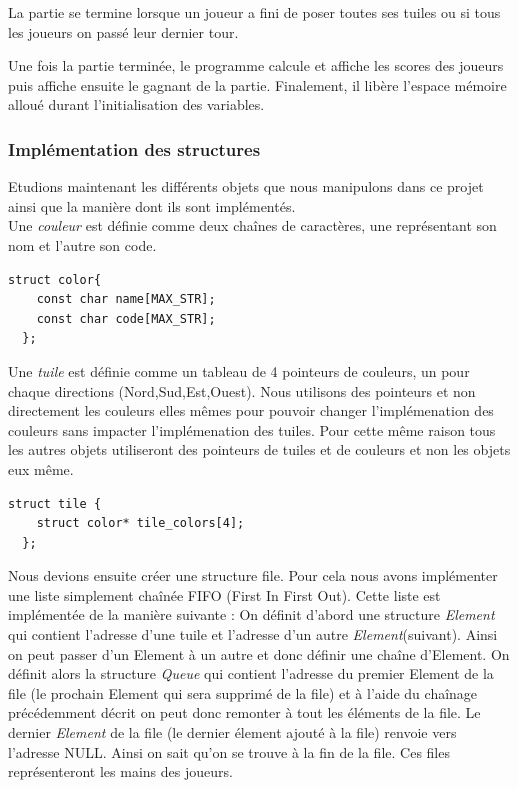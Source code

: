 \documentclass[12pt,a4paper]{extarticle}
\begin{document}
    La partie se termine lorsque un joueur a fini de poser toutes ses tuiles ou si tous les joueurs on pass\'e leur dernier tour.
    
    Une fois la partie termin\'ee, le programme calcule et affiche les scores des joueurs puis affiche ensuite le gagnant de la partie. Finalement, il lib\`ere l'espace 
    m\'emoire allou\'e durant l'initialisation des variables.


    \subsubsection{Impl\'ementation des structures}
    Etudions maintenant les diff\'erents objets que nous manipulons dans ce projet ainsi 
    que la mani\`ere dont ils sont impl\'ement\'es.
    \newline \\
    Une \emph{couleur} est d\'efinie comme deux cha\^ines de caract\`eres, une repr\'esentant 
    son nom et l'autre son code.


    \begin{lstlisting}[style=CStyle]
struct color{
    const char name[MAX_STR];
    const char code[MAX_STR];
  }; \end{lstlisting}
    
    
    
    Une \emph{tuile} est d\'efinie comme un tableau de 4 pointeurs de couleurs, 
    un pour chaque directions (Nord,Sud,Est,Ouest). 
    Nous utilisons des pointeurs et non directement les couleurs elles m\^emes pour 
    pouvoir changer l'impl\'emenation des couleurs sans impacter l'impl\'emenation des tuiles.
     Pour cette m\^eme raison tous les autres objets utiliseront des pointeurs de tuiles et 
     de couleurs et non les objets eux m\^eme.
    

     \begin{lstlisting}[style=CStyle]
struct tile {
    struct color* tile_colors[4];
  }; \end{lstlisting}
     
     
    Nous devions ensuite cr\'eer une structure file. Pour cela nous avons impl\'ementer 
    une liste simplement cha\^in\'ee FIFO (First In First Out). Cette liste est impl\'ement\'ee de la mani\`ere suivante :
    On d\'efinit d'abord une structure \emph{Element} qui contient l'adresse d'une tuile et l'adresse d'un autre \emph{Element}(suivant). Ainsi on peut passer d'un Element 
    \`a un autre et donc d\'efinir une cha\^ine d'Element.
    On d\'efinit alors la structure \emph{Queue} qui contient l'adresse du premier Element de la file (le prochain Element qui sera supprim\'e de la file) et \`a
     l'aide du cha\^inage pr\'ec\'edemment d\'ecrit on peut donc remonter \`a tout les \'el\'ements de la file. Le dernier \emph{Element} de la file (le dernier \'element 
     ajout\'e \`a la file) renvoie vers l'adresse NULL. Ainsi on sait qu'on se trouve \`a la fin de la file.
    Ces files repr\'esenteront les mains des joueurs.\newpage
    
\end{document}
